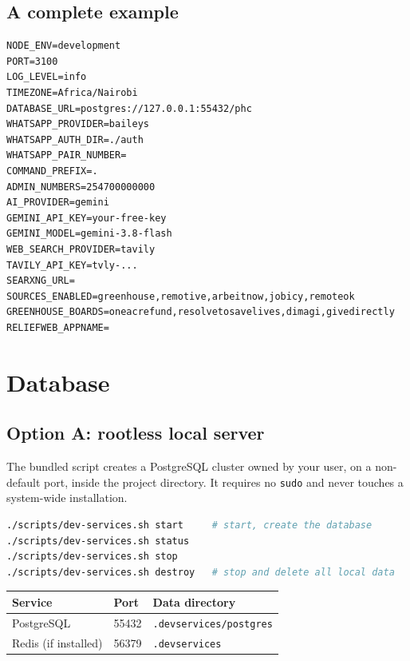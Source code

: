 \documentclass[11pt,a4paper]{report}
\begin{document}
\section{A complete example}

\noindent\begin{minipage}{\textwidth}
\begin{lstlisting}[language=envfile]
NODE_ENV=development
PORT=3100
LOG_LEVEL=info
TIMEZONE=Africa/Nairobi
DATABASE_URL=postgres://127.0.0.1:55432/phc
WHATSAPP_PROVIDER=baileys
WHATSAPP_AUTH_DIR=./auth
WHATSAPP_PAIR_NUMBER=
COMMAND_PREFIX=.
ADMIN_NUMBERS=254700000000
AI_PROVIDER=gemini
GEMINI_API_KEY=your-free-key
GEMINI_MODEL=gemini-3.8-flash
WEB_SEARCH_PROVIDER=tavily
TAVILY_API_KEY=tvly-...
SEARXNG_URL=
SOURCES_ENABLED=greenhouse,remotive,arbeitnow,jobicy,remoteok
GREENHOUSE_BOARDS=oneacrefund,resolvetosavelives,dimagi,givedirectly
RELIEFWEB_APPNAME=
\end{lstlisting}
\end{minipage}

\chapter{Database}

\section{Option A: rootless local server}

The bundled script creates a PostgreSQL cluster owned by your user, on a
non-default port, inside the project directory. It requires no \texttt{sudo}
and never touches a system-wide installation.

\begin{lstlisting}[language=bash]
./scripts/dev-services.sh start     # start, create the database
./scripts/dev-services.sh status
./scripts/dev-services.sh stop
./scripts/dev-services.sh destroy   # stop and delete all local data
\end{lstlisting}

\begin{center}
\begin{tabular}{@{}lll@{}}
\toprule
\textbf{Service} & \textbf{Port} & \textbf{Data directory} \\
\midrule
PostgreSQL & 55432 & \texttt{.devservices/postgres} \\
Redis (if installed) & 56379 & \texttt{.devservices} \\
\bottomrule
\end{tabular}
\end{center}
\end{document}
